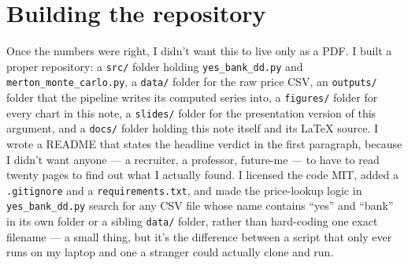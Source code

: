 \section{Building the repository}

Once the numbers were right, I didn't want this to live only as a PDF. I built a proper repository: a \texttt{src/} folder holding \texttt{yes\_bank\_dd.py} and \texttt{merton\_monte\_carlo.py}, a \texttt{data/} folder for the raw price CSV, an \texttt{outputs/} folder that the pipeline writes its computed series into, a \texttt{figures/} folder for every chart in this note, a \texttt{slides/} folder for the presentation version of this argument, and a \texttt{docs/} folder holding this note itself and its \LaTeX{} source. I wrote a README that states the headline verdict in the first paragraph, because I didn't want anyone — a recruiter, a professor, future-me — to have to read twenty pages to find out what I actually found. I licensed the code MIT, added a \texttt{.gitignore} and a \texttt{requirements.txt}, and made the price-lookup logic in \texttt{yes\_bank\_dd.py} search for any CSV file whose name contains ``yes'' and ``bank'' in its own folder or a sibling \texttt{data/} folder, rather than hard-coding one exact filename — a small thing, but it's the difference between a script that only ever runs on my laptop and one a stranger could actually clone and run.

